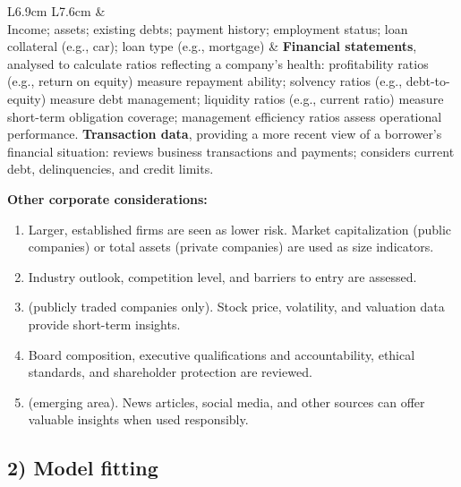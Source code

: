 \begin{center}
\footnotesize
\begin{tabular}{L{6.9cm} L{7.6cm}}
\toprule
{} &  \\
\midrule
Income; assets; existing debts; payment history; employment status; loan
collateral (e.g., car); loan type (e.g., mortgage) &
\textbf{Financial statements}, analysed to calculate ratios reflecting a
company's health: profitability ratios (e.g., return on equity) measure repayment
ability; solvency ratios (e.g., debt-to-equity) measure debt management;
liquidity ratios (e.g., current ratio) measure short-term obligation coverage;
management efficiency ratios assess operational performance.
\newline\newline
\textbf{Transaction data}, providing a more recent view of a borrower's financial
situation: reviews business transactions and payments; considers current debt,
delinquencies, and credit limits. \\
\bottomrule
\end{tabular}
\end{center}

\textbf{Other corporate considerations:}

\begin{enumerate}[label=\alph*)]
\item {} Larger, established firms are seen as lower risk.
Market capitalization (public companies) or total assets (private companies) are
used as size indicators.
\item {} Industry outlook, competition
level, and barriers to entry are assessed.
\item {} (publicly traded companies only). Stock price,
volatility, and valuation data provide short-term insights.
\item {} Board composition, executive qualifications
and accountability, ethical standards, and shareholder protection are reviewed.
\item {} (emerging area). News articles, social
media, and other sources can offer valuable insights when used responsibly.
\end{enumerate}

\subsection*{2) Model fitting}

